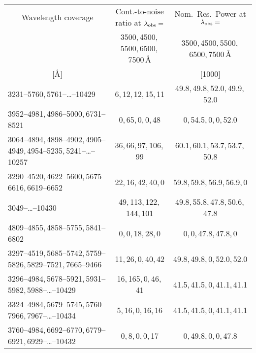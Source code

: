 {\begin{tabular}{lcc}
\hline
  \multicolumn{1}{c}{Wavelength coverage} &
  \multicolumn{1}{c}{Cont.-to-noise ratio at $\lambda_{\rm obs}=$} &
  \multicolumn{1}{c}{Nom.\ Res.\ Power at $\lambda_{\rm obs}=$} \\
  &
  \multicolumn{1}{c}{3500,\,4500,\,5500,\,6500,\,7500\,\AA} &
  \multicolumn{1}{c}{3500,\,4500,\,5500,\,6500,\,7500\,\AA} \\
  \multicolumn{1}{c}{[\AA]} &
  &
  \multicolumn{1}{c}{[1000]} \\
\hline
  3231--5760,\,5761--\ldots--10429                                         & 6,\,12,\,12,\,15,\,11      & 49.8,\,49.8,\,52.0,\,49.9,\,52.0 \\
  3952--4981,\,4986--5000,\,6731--8521                                     & 0,\,65,\,0,\,0,\,48        & 0,\,54.5,\,0,\,0,\,52.0          \\
  3064--4894,\,4898--4902,\,4905--4949,\,4954--5235,\,5241--\ldots--10257  & 36,\,66,\,97,\,106,\,99    & 60.1,\,60.1,\,53.7,\,53.7,\,50.8 \\
  3290--4520,\,4622--5600,\,5675--6616,\,6619--6652                        & 22,\,16,\,42,\,40,\,0      & 59.8,\,59.8,\,56.9,\,56.9,\,0    \\
  3049--\ldots--10430                                                      & 49,\,113,\,122,\,144,\,101 & 49.8,\,55.8,\,47.8,\,50.6,\,47.8 \\
  4809--4855,\,4858--5755,\,5841--6802                                     & 0,\,0,\,18,\,28,\,0        & 0,\,0,\,47.8,\,47.8,\,0          \\
  3297--4519,\,5685--5742,\,5759--5826,\,5829--7521,\,7665--9466           & 11,\,26,\,0,\,40,\,42      & 49.8,\,49.8,\,0,\,52.0,\,52.0    \\
  3296--4984,\,5678--5921,\,5931--5982,\,5988--\ldots--10429               & 16,\,165,\,0,\,46,\,41     & 41.5,\,41.5,\,0,\,41.1,\,41.1    \\
  3324--4984,\,5679--5745,\,5760--7966,\,7967--\ldots--10434               & 5,\,16,\,0,\,16,\,16       & 41.5,\,41.5,\,0,\,41.1,\,41.1    \\
  3760--4984,\,6692--6770,\,6779--6921,\,6929--\ldots--10432               & 0,\,8,\,0,\,0,\,17         & 0,\,49.8,\,0,\,0,\,47.8          \\
\hline
\end{tabular}
}

